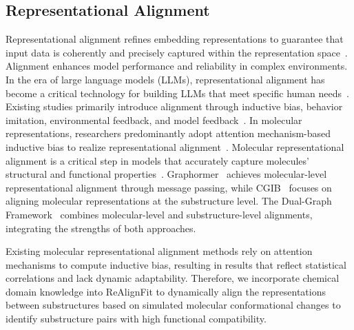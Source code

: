 \subsection{Representational Alignment}
Representational alignment refines embedding representations to guarantee that input data is coherently and precisely captured within the representation space~\cite{zhou2024lima,kopf2024openassistant,ji2024beavertails}. Alignment enhances model performance and reliability in complex environments. In the era of large language models (LLMs), representational alignment has become a critical technology for building LLMs that meet specific human needs~\cite{cao2024towards,kirk2024benefits}.
Existing studies primarily introduce alignment through inductive bias, behavior imitation, environmental feedback, and model feedback~\cite{cao2024towards}. In molecular representations, researchers predominantly adopt attention mechanism-based inductive bias to realize representational alignment~\cite{hamamsy2024protein}.
Molecular representational alignment is a critical step in models that accurately capture molecules' structural and functional properties~\cite{wang2024KDD2,seo2024selfKDD}.
Graphormer~\cite{mu2024graphormer} achieves molecular-level representational alignment through message passing, while CGIB~\cite{lee2023cgibICML} focuses on aligning molecular representations at the substructure level. The Dual-Graph Framework~\cite{dualgraph} combines molecular-level and substructure-level alignments, integrating the strengths of both approaches.


Existing molecular representational alignment methods rely on attention mechanisms to compute inductive bias, resulting in results that reflect statistical correlations and lack dynamic adaptability. Therefore, we incorporate chemical domain knowledge into ReAlignFit to dynamically align the representations between substructures based on simulated molecular conformational changes to identify substructure pairs with high functional compatibility.
